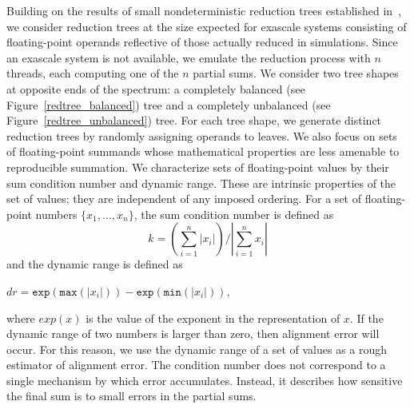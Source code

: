 Building on the results of small nondeterministic reduction trees
established in~\cite{chiang13, langlois}, we consider reduction trees
at the size expected for exascale systems consisting of floating-point
operands reflective of those actually reduced in simulations. Since an
exascale system is not available, we emulate the reduction process
with $n$ threads, each computing one of the $n$ partial sums.  We
consider two tree shapes at opposite ends of the spectrum: a
completely balanced (see Figure~\ref{redtree_balanced}) tree and a
completely unbalanced (see Figure~\ref{redtree_unbalanced}) tree.  For
each tree shape, we generate distinct reduction trees by randomly
assigning operands to leaves. We also focus on sets of floating-point
summands whose mathematical properties are less amenable to
reproducible summation. We characterize sets of floating-point values
by their sum condition number and dynamic range. These are intrinsic
properties of the set of values; they are independent of any imposed
ordering. For a set of floating-point numbers $\{x_1, \ldots, x_n
\}$, the sum condition number is defined as
\[k = \left(\sum_{i=1}^{n}|x_i|\right)/\left|\sum_{i=1}^{n}x_i\right|\] and
the dynamic range is defined as
\begin{center}
	$dr = \texttt{exp}(\texttt{max}(|x_i|))-\texttt{exp}(\texttt{min}(|x_i|)),$
\end{center}
where $exp(x)$ is the value of the exponent in the representation of
$x$.  If the dynamic range of two numbers is larger than zero, then
alignment error will occur. For this reason, we use the dynamic range
of a set of values as a rough estimator of alignment error.  The
condition number does not correspond to a single mechanism by which
error accumulates.  Instead, it describes how sensitive the final sum
is to small errors in the partial sums.


